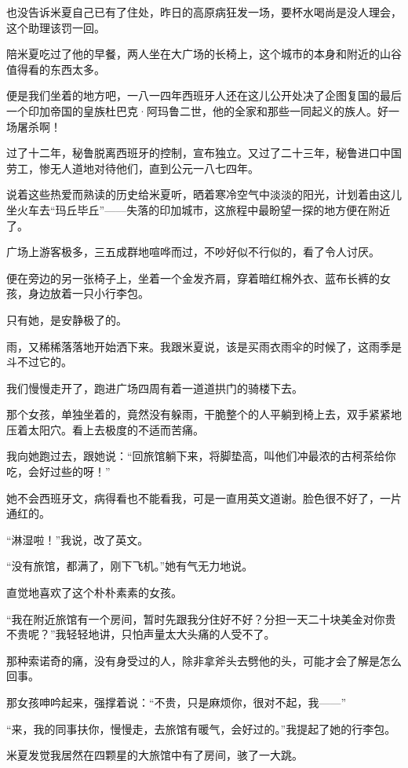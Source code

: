 \par 也没告诉米夏自己已有了住处，昨日的高原病狂发一场，要杯水喝尚是没人理会，这个助理该罚一回。
\par 陪米夏吃过了他的早餐，两人坐在大广场的长椅上，这个城市的本身和附近的山谷值得看的东西太多。
\par 便是我们坐着的地方吧，一八一四年西班牙人还在这儿公开处决了企图复国的最后一个印加帝国的皇族杜巴克·阿玛鲁二世，他的全家和那些一同起义的族人。好一场屠杀啊！
\par 过了十二年，秘鲁脱离西班牙的控制，宣布独立。又过了二十三年，秘鲁进口中国劳工，惨无人道地对待他们，直到公元一八七四年。
\par 说着这些热爱而熟读的历史给米夏听，晒着寒冷空气中淡淡的阳光，计划着由这儿坐火车去“玛丘毕丘”——失落的印加城市，这旅程中最盼望一探的地方便在附近了。
\par 广场上游客极多，三五成群地喧哗而过，不吵好似不行似的，看了令人讨厌。
\par 便在旁边的另一张椅子上，坐着一个金发齐肩，穿着暗红棉外衣、蓝布长裤的女孩，身边放着一只小行李包。
\par 只有她，是安静极了的。
\par 雨，又稀稀落落地开始洒下来。我跟米夏说，该是买雨衣雨伞的时候了，这雨季是斗不过它的。
\par 我们慢慢走开了，跑进广场四周有着一道道拱门的骑楼下去。
\par 那个女孩，单独坐着的，竟然没有躲雨，干脆整个的人平躺到椅上去，双手紧紧地压着太阳穴。看上去极度的不适而苦痛。
\par 我向她跑过去，跟她说：“回旅馆躺下来，将脚垫高，叫他们冲最浓的古柯茶给你吃，会好过些的呀！”
\par 她不会西班牙文，病得看也不能看我，可是一直用英文道谢。脸色很不好了，一片通红的。
\par “淋湿啦！”我说，改了英文。
\par “没有旅馆，都满了，刚下飞机。”她有气无力地说。
\par 直觉地喜欢了这个朴朴素素的女孩。
\par “我在附近旅馆有一个房间，暂时先跟我分住好不好？分担一天二十块美金对你贵不贵呢？”我轻轻地讲，只怕声量太大头痛的人受不了。
\par 那种索诺奇的痛，没有身受过的人，除非拿斧头去劈他的头，可能才会了解是怎么回事。
\par 那女孩呻吟起来，强撑着说：“不贵，只是麻烦你，很对不起，我——”
\par “来，我的同事扶你，慢慢走，去旅馆有暖气，会好过的。”我提起了她的行李包。
\par 米夏发觉我居然在四颗星的大旅馆中有了房间，骇了一大跳。
